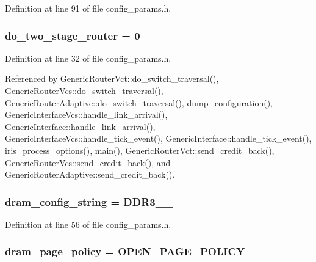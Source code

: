 Definition at line 91 of file config\_\-params.h.
\subsubsection[{do\_\-two\_\-stage\_\-router}]{ {\bf do\_\-two\_\-stage\_\-router} = 0}\label{config__params_8h_5ef61643d57baddad3f036737403d4cf}




Definition at line 32 of file config\_\-params.h.

Referenced by GenericRouterVct::do\_\-switch\_\-traversal(), GenericRouterVcs::do\_\-switch\_\-traversal(), GenericRouterAdaptive::do\_\-switch\_\-traversal(), dump\_\-configuration(), GenericInterfaceVcs::handle\_\-link\_\-arrival(), GenericInterface::handle\_\-link\_\-arrival(), GenericInterfaceVcs::handle\_\-tick\_\-event(), GenericInterface::handle\_\-tick\_\-event(), iris\_\-process\_\-options(), main(), GenericRouterVct::send\_\-credit\_\-back(), GenericRouterVcs::send\_\-credit\_\-back(), and GenericRouterAdaptive::send\_\-credit\_\-back().
\subsubsection[{dram\_\-config\_\-string}]{ {\bf dram\_\-config\_\-string} = DDR3\_\_}\label{config__params_8h_3b6b4be16dd8a08f4cb1f477dee6ca48}




Definition at line 56 of file config\_\-params.h.
\subsubsection[{dram\_\-page\_\-policy}]{ {\bf dram\_\-page\_\-policy} = OPEN\_\-PAGE\_\-POLICY}\label{config__params_8h_9b7e9850a84a1625ba61689a4c8b7686}




